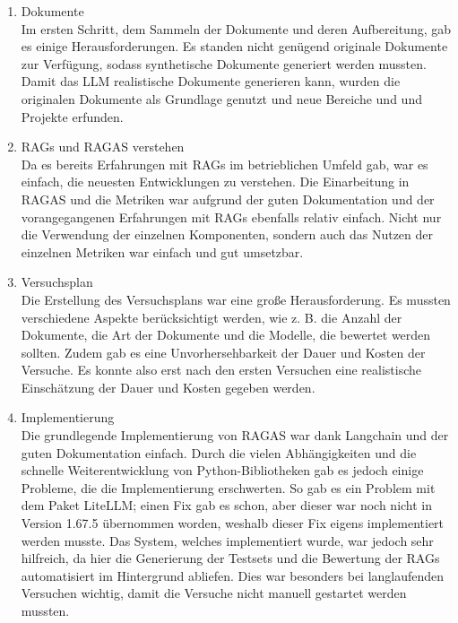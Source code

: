 \begin{enumerate}

    \item{Dokumente}\\
    Im ersten Schritt, dem Sammeln der Dokumente und deren Aufbereitung, gab es einige Herausforderungen.
    Es standen nicht genügend originale Dokumente zur Verfügung, sodass synthetische Dokumente generiert werden mussten.
    Damit das LLM realistische Dokumente generieren kann, wurden die originalen Dokumente als Grundlage genutzt und neue Bereiche und und Projekte erfunden.

    \item{RAGs und RAGAS verstehen}\\
    Da es bereits Erfahrungen mit RAGs im betrieblichen Umfeld gab, war es einfach, die neuesten Entwicklungen zu verstehen.
    Die Einarbeitung in RAGAS und die Metriken war aufgrund der guten Dokumentation und der vorangegangenen Erfahrungen mit RAGs ebenfalls relativ einfach.
    Nicht nur die Verwendung der einzelnen Komponenten, sondern auch das Nutzen der einzelnen Metriken war einfach und gut umsetzbar.

    \item{Versuchsplan}\\
    Die Erstellung des Versuchsplans war eine große Herausforderung.
    Es mussten verschiedene Aspekte berücksichtigt werden, wie z. B. die Anzahl der Dokumente, die Art der Dokumente und die Modelle, die bewertet werden sollten.
    Zudem gab es eine Unvorhersehbarkeit der Dauer und Kosten der Versuche.
    Es konnte also erst nach den ersten Versuchen eine realistische Einschätzung der Dauer und Kosten gegeben werden.

    \item{Implementierung}\\
    Die grundlegende Implementierung von RAGAS war dank Langchain und der guten Dokumentation einfach.
    Durch die vielen Abhängigkeiten und die schnelle Weiterentwicklung von Python-Bibliotheken gab es jedoch einige Probleme, die die Implementierung erschwerten.
    So gab es ein Problem mit dem Paket LiteLLM; einen Fix gab es schon, aber dieser war noch nicht in Version 1.67.5 übernommen worden, weshalb dieser Fix eigens implementiert werden musste.
    Das System, welches implementiert wurde, war jedoch sehr hilfreich, da hier die Generierung der Testsets und die Bewertung der RAGs automatisiert im Hintergrund abliefen.
    Dies war besonders bei langlaufenden Versuchen wichtig, damit die Versuche nicht manuell gestartet werden mussten.


\end{enumerate}
